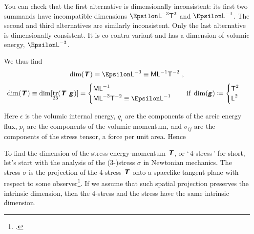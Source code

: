 \documentclass[\ifafour a4paper,12pt,\else a5paper,10pt,\fi%
onecolumn,oneside,article,%
british%
]{memoir}
\makeatletter
\newcommand*{\defquote}[1]{`\,#1\,'}
\theoremstyle{remark}
\theoremstyle{innote}
\newcommand*{\mathte}[1]{\textbf{\textit{\textsf{#1}}}}
\newcommand*{\citep}{\footcites}
\DeclareMathOperator{\tr}{tr}%
\newcommand*{\defd}{\coloneqq}
\renewcommand*{\|}[1][]{\nonscript\,#1\vert\nonscript\;\mathopen{}}
\newcommand*{\sect}{\S}%
\newcommand*{\q}{}%
\DeclareRobustCommand*{\q}{%
  \mathbin{\mathpalette\bigcdot@{}}%
}
\newcommand*{\bigcdot@scalefactor}{0.7}
\newcommand*{\bigcdot@widthfactor}{1.5}
\newcommand*{\bigcdot@}[2]{%
  \sbox0{$#1\vcenter{}$}%
  \sbox2{$#1\cdot\m@th$}%
  \hbox to \bigcdot@widthfactor\wd2{%
    \hfil
    \raise\ht0\hbox{%
      \scalebox{\bigcdot@scalefactor}{%
        \lower\ht0\hbox{$#1\bullet\m@th$}%
      }%
    }%
    \hfil
  }%
}
\newcommand*{\Le}{\textsf{L}}
\newcommand*{\Ti}{\textsf{T}}
\newcommand*{\Ma}{\textsf{M}}
\newcommand*{\En}{\Epsilon}%
\newcommand*{\yg}{\mathte{g}}
\newcommand*{\yT}{\mathte{T}}
\renewcommand*{\i}{\indices}
\newcommand*{\en}{\epsilon}
\newcommand*{\yq}{q}
\newcommand*{\yp}{p}
\newcommand*{\yt}{\sigma}
\makeatother
\begin{document}
You can check that the first alternative is dimensionally inconsistent: its
first two summands have incompatible dimensions $\En\Le^{-3}\Ti^{2}$ and
$\En\Le^{-1}$. The second and third alternatives are similarly
inconsistent. Only the last alternative is dimensionally consistent. It is
co-contra-variant and has a dimension of volumic energy, $\En\Le^{-3}$.

We thus find
\begin{gather}
  \label{eq:dim_T_co_contra}
  \dim(\yT\i{_{\q}^{\q}}) = \En\Le^{-3} \equiv \Ma\Le^{-1}\Ti^{-2} \ ,
  \\[\jot]
  \dim(\yT\i{_{\q\q}}) \equiv
  \dim[\tr_{23}(\yT\i{_{\q}^{\q}}\ \yg\i{_{\q\q}})]
= 
    \begin{cases}
    \Ma\Le^{-1} \\
    \Ma\Le^{-3}\Ti^{-2} \equiv \En\Le^{-1}
  \end{cases}
  \quad\text{if }\dim(\yg)\defd
  \begin{cases}
     \Ti^2 \\
    \Le^2
  \end{cases}
\end{gather}










Here
$\en$ is the volumic internal energy, $\yq_{i}$ are the components of the
areic energy flux, $\yp_{i}$ are the components of the volumic momentum,
and $\yt_{ij}$ are the components of the stress tensor, a force per unit
area. Hence



To find the dimension of the stress-energy-momentum $\yT$, or
\defquote{4-stress} for short, let's start with the analysis of the
(3-)stress $\yt$ in Newtonian mechanics. The stress $\yt$ is the projection
of the 4-stress $\yT$ onto a spacelike tangent plane with respect to some
observer\citep[\sect~3.4.1]{gourgoulhon2007_r2012}{smarretal1978,york1979,smarretal1980}[\sect~1.3]{wilsonetal2003_r2007}[the
projection doesn't need to be
orthogonal:][\sect~2.4]{marsdenetal1983b_r1994}[\sect~B.1.4]{hehletal2003}. If we
assume that such spatial projection preserves the intrinsic dimension, then
the 4-stress and the stress have the same intrinsic dimension.
\end{document}
